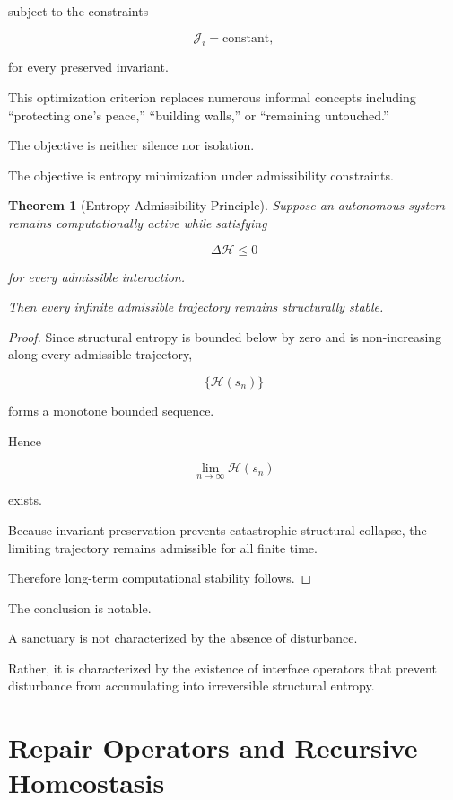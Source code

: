 \documentclass[11pt,oneside]{book}
\numberwithin{equation}{chapter}
\theoremstyle{definition}
\theoremstyle{plain}
\newtheorem{theorem}[definition]{Theorem}
\begin{document}
subject to the constraints

\[
\mathcal{J}_i
=
\text{constant},
\]

for every preserved invariant.

This optimization criterion replaces numerous informal concepts including
``protecting one's peace,'' ``building walls,'' or ``remaining untouched.''

The objective is neither silence nor isolation.

The objective is entropy minimization under admissibility constraints.

\begin{theorem}[Entropy-Admissibility Principle]

Suppose an autonomous system remains computationally active while satisfying

\[
\Delta\mathcal{H}\le0
\]

for every admissible interaction.

Then every infinite admissible trajectory remains structurally stable.

\end{theorem}

\begin{proof}

Since structural entropy is bounded below by zero and is non-increasing along
every admissible trajectory,

\[
\{\mathcal{H}(s_n)\}
\]

forms a monotone bounded sequence.

Hence

\[
\lim_{n\rightarrow\infty}
\mathcal{H}(s_n)
\]

exists.

Because invariant preservation prevents catastrophic structural collapse,
the limiting trajectory remains admissible for all finite time.

Therefore long-term computational stability follows.

\end{proof}

The conclusion is notable.

A sanctuary is not characterized by the absence of disturbance.

Rather, it is characterized by the existence of interface operators that
prevent disturbance from accumulating into irreversible structural entropy.

\chapter{Repair Operators and Recursive Homeostasis}
\end{document}
